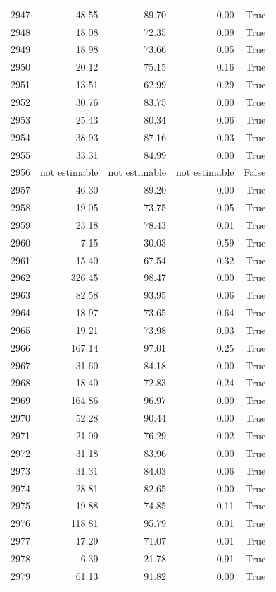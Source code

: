 \begin{longtable}{rrrrr}
2947 & 48.55 & 89.70 & 0.00 & True \\
2948 & 18.08 & 72.35 & 0.09 & True \\
2949 & 18.98 & 73.66 & 0.05 & True \\
2950 & 20.12 & 75.15 & 0.16 & True \\
2951 & 13.51 & 62.99 & 0.29 & True \\
2952 & 30.76 & 83.75 & 0.00 & True \\
2953 & 25.43 & 80.34 & 0.06 & True \\
2954 & 38.93 & 87.16 & 0.03 & True \\
2955 & 33.31 & 84.99 & 0.00 & True \\
2956 & not estimable & not estimable & not estimable & False \\
2957 & 46.30 & 89.20 & 0.00 & True \\
2958 & 19.05 & 73.75 & 0.05 & True \\
2959 & 23.18 & 78.43 & 0.01 & True \\
2960 & 7.15 & 30.03 & 0.59 & True \\
2961 & 15.40 & 67.54 & 0.32 & True \\
2962 & 326.45 & 98.47 & 0.00 & True \\
2963 & 82.58 & 93.95 & 0.06 & True \\
2964 & 18.97 & 73.65 & 0.64 & True \\
2965 & 19.21 & 73.98 & 0.03 & True \\
2966 & 167.14 & 97.01 & 0.25 & True \\
2967 & 31.60 & 84.18 & 0.00 & True \\
2968 & 18.40 & 72.83 & 0.24 & True \\
2969 & 164.86 & 96.97 & 0.00 & True \\
2970 & 52.28 & 90.44 & 0.00 & True \\
2971 & 21.09 & 76.29 & 0.02 & True \\
2972 & 31.18 & 83.96 & 0.00 & True \\
2973 & 31.31 & 84.03 & 0.06 & True \\
2974 & 28.81 & 82.65 & 0.00 & True \\
2975 & 19.88 & 74.85 & 0.11 & True \\
2976 & 118.81 & 95.79 & 0.01 & True \\
2977 & 17.29 & 71.07 & 0.01 & True \\
2978 & 6.39 & 21.78 & 0.91 & True \\
2979 & 61.13 & 91.82 & 0.00 & True \\

\end{longtable}
